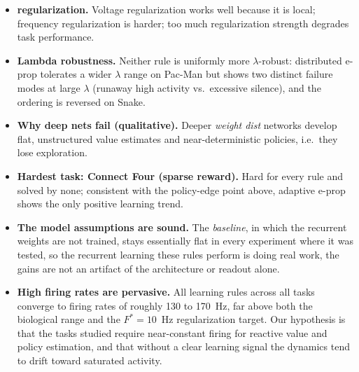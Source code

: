 \begin{itemize}
  \item \textbf{regularization.} Voltage regularization works well because it is local; frequency
  regularization is harder; too much regularization strength degrades task performance.
  \item \textbf{Lambda robustness.} Neither rule is uniformly more $\lambda$-robust: distributed
  e-prop tolerates a wider $\lambda$ range on Pac-Man but shows two distinct failure modes at large
  $\lambda$ (runaway high activity vs.\ excessive silence), and the ordering is reversed on Snake.
  \item \textbf{Why deep nets fail (qualitative).} Deeper \emph{weight dist} networks develop flat,
  unstructured value estimates and near-deterministic policies, i.e.\ they lose exploration.
  \item \textbf{Hardest task: Connect Four (sparse reward).} Hard for every rule and solved by none;
  consistent with the policy-edge point above, adaptive e-prop shows the only positive learning
  trend.
  \item \textbf{The model assumptions are sound.} The \emph{baseline}, in which the recurrent
  weights are not trained, stays essentially flat in every experiment where it was tested, so the
  recurrent learning these rules perform is doing real work, the gains are not an artifact of the
  architecture or readout alone.
    \item \textbf{High firing rates are pervasive.} All learning rules across all
    tasks converge to firing rates of roughly 130 to 170~Hz, far above both the
    biological range and the $F^* = 10$~Hz regularization target. Our hypothesis is
    that the tasks studied require near-constant firing for reactive value and
    policy estimation, and that without a clear learning signal the dynamics tend
    to drift toward saturated activity.
\end{itemize}
